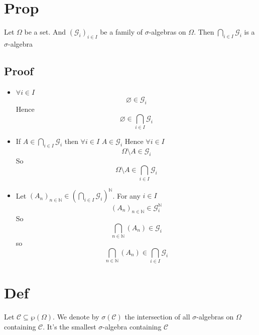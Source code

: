 \documentclass{book}
\begin{document}
\section{Prop}
Let $\Omega$ be a set. And $(\mathcal{G}_i)_{i\in I}$ be a family of $\sigma$-algebras on $\Omega$. Then $\bigcap\limits_{i\in I}\mathcal{G}_i$ is a $\sigma$-algebra
\subsection*{Proof}
\begin{itemize}
    \item $\forall i\in I$ $$\varnothing\in \mathcal{G}_i$$Hence $$\varnothing\in \bigcap\limits_{i\in I}\mathcal{G}_i$$
    \item If $A\in \bigcap\limits_{i\in I}\mathcal{G}_i$ then $\forall i\in I$ $A\in \mathcal{G}_i$ Hence $\forall i\in I$ $$\Omega\setminus A\in \mathcal{G}_i$$
    So $$\Omega\setminus A\in \bigcap\limits_{i\in I}\mathcal{G}_i$$
    \item Let $(A_n)_{n\in \mathbb{N}}\in (\bigcap\limits_{i\in I}\mathcal{G}_i)^\mathbb{N}$. For any $i\in I $$$(A_n)_{n\in\mathbb{N}}\in \mathcal{G}_i^\mathbb{N}$$  So $$\bigcap\limits_{n\in \mathbb{N}}(A_n)\in \mathcal{G}_i$$so $$\bigcap\limits_{n\in \mathbb{N}}(A_n)\in \bigcap\limits_{i\in I}\mathcal{G}_i$$
\end{itemize}
\section{Def}
Let $\mathcal{C}\subseteq \wp(\Omega)$. We denote by $\sigma(\mathcal{C})$ the intersection of all $\sigma$-algebras on $\Omega$ containing $\mathcal{C}$. It's the smallest $\sigma$-algebra containing $\mathcal{C}$
\end{document}
